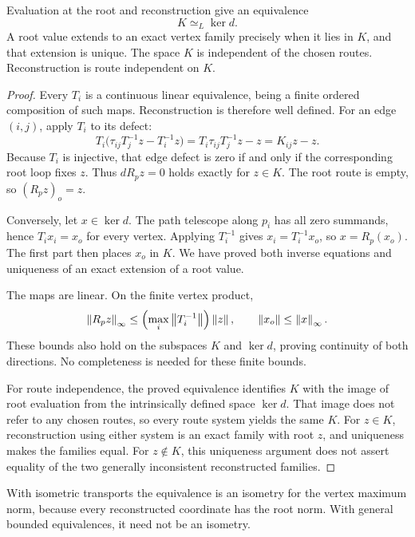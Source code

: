 \begin{theorem}\label{KS41}
Evaluation at the root and reconstruction give an equivalence
\[
 K\simeq_L\ker d.
\]
A root value extends to an exact vertex family precisely when it lies in \(K\), and that extension is unique. The space \(K\) is independent of the chosen routes. Reconstruction is route independent on \(K\).
\end{theorem}
\begin{proof}
Every \(T_i\) is a continuous linear equivalence, being a finite ordered composition of such maps. Reconstruction is therefore well defined. For an edge \((i,j)\), apply \(T_i\) to its defect:
\[
 T_i\bigl(\tau_{ij}T_j^{-1}z-T_i^{-1}z\bigr)
 =T_i\tau_{ij}T_j^{-1}z-z=K_{ij}z-z.
\]
Because \(T_i\) is injective, that edge defect is zero if and only if the corresponding root loop fixes \(z\). Thus \(dR_pz=0\) holds exactly for \(z\in K\). The root route is empty, so \((R_pz)_o=z\).

Conversely, let \(x\in\ker d\). The path telescope along \(p_i\) has all zero summands, hence \(T_ix_i=x_o\) for every vertex. Applying \(T_i^{-1}\) gives \(x_i=T_i^{-1}x_o\), so \(x=R_p(x_o)\). The first part then places \(x_o\) in \(K\). We have proved both inverse equations and uniqueness of an exact extension of a root value.

The maps are linear. On the finite vertex product,
\[
 \left\lVert R_pz\right\rVert_\infty\le\left(\max_i\left\lVert T_i^{-1}\right\rVert\right)\left\lVert z\right\rVert,
 \qquad \left\lVert x_o\right\rVert\le\left\lVert x\right\rVert_\infty.
\]
These bounds also hold on the subspaces \(K\) and \(\ker d\), proving continuity of both directions. No completeness is needed for these finite bounds.

For route independence, the proved equivalence identifies \(K\) with the image of root evaluation from the intrinsically defined space \(\ker d\). That image does not refer to any chosen routes, so every route system yields the same \(K\). For \(z\in K\), reconstruction using either system is an exact family with root \(z\), and uniqueness makes the families equal. For \(z\notin K\), this uniqueness argument does not assert equality of the two generally inconsistent reconstructed families.
\end{proof}
With isometric transports the equivalence is an isometry for the vertex maximum norm, because every reconstructed coordinate has the root norm. With general bounded equivalences, it need not be an isometry.


